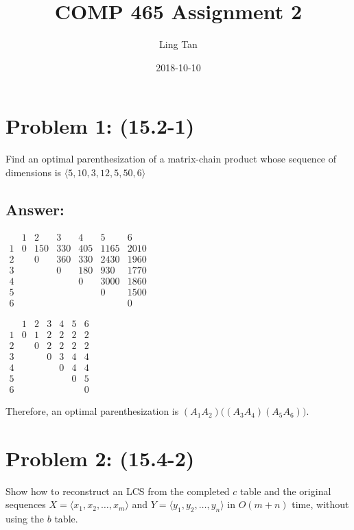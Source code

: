 \documentclass[letter]{article}
\title{COMP 465 Assignment 2}
\date{2018-10-10}
\author{Ling Tan}
\begin{document}
\maketitle

\section*{Problem 1: (15.2-1)} Find an optimal parenthesization of a matrix-chain product whose sequence of dimensions is $\langle5, 10, 3, 12, 5, 50, 6\rangle$
\subsection*{Answer:}
\begin{table}[H]
    \centering
    $
    \begin{array}{c|cccccc}
     & 1 & 2 & 3 & 4 & 5 & 6\\
    \hline
     1 & 0 & 150 & 330 & 405 & 1165 & 2010\\
     2 &   & 0 & 360 & 330 & 2430 & 1960\\
     3 &   &   & 0 & 180 & 930 & 1770\\
     4 &   &   &   & 0 & 3000 & 1860\\
     5 &   &   &   &   & 0 & 1500\\
     6 &   &   &   &   &   & 0
    \end{array}
    $
\end{table}
\begin{table}[H]
    \centering
    $
    \begin{array}{c|cccccc}
     & 1 & 2 & 3 & 4 & 5 & 6\\
    \hline
     1 & 0 & 1 & 2 & 2 & 2 & 2\\
     2 &   & 0 & 2 & 2 & 2 & 2\\
     3 &   &   & 0 & 3 & 4 & 4\\
     4 &   &   &   & 0 & 4 & 4\\
     5 &   &   &   &   & 0 & 5\\
     6 &   &   &   &   &   & 0
    \end{array}
    $
\end{table}
Therefore, an optimal parenthesization is $(A_1A_2)\big((A_3A_4)(A_5A_6)\big)$.

\section*{Problem 2: (15.4-2) } Show how to reconstruct an LCS from the completed $c$ table and the original sequences $X = \langle x_1, x_2,\dots, x_m\rangle$ and $Y = \langle y_1, y_2, \dots, y_n\rangle$ in $O(m +n)$ time, without using the $b$ table.
\end{document}

